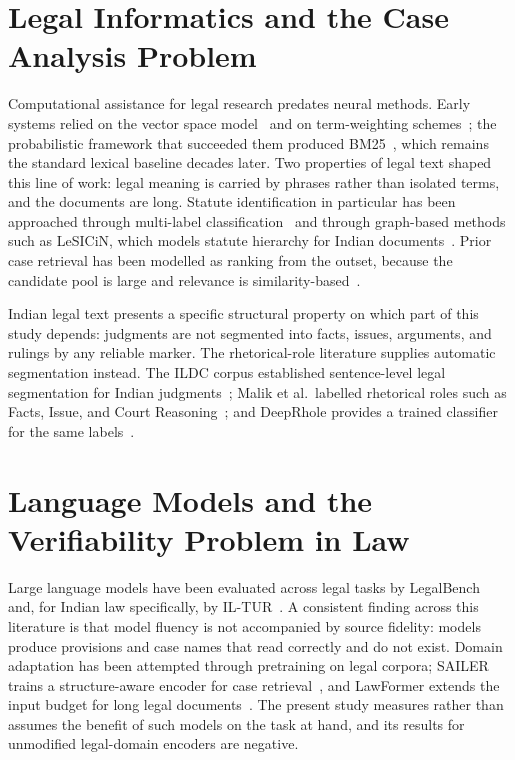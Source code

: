\documentclass{mnnit}
\begin{document}
\section{Legal Informatics and the Case Analysis Problem}
Computational assistance for legal research predates neural
methods. Early systems relied on the vector space
model~\cite{salton1975vector} and on term-weighting
schemes~\cite{salton1988termweight}; the probabilistic framework
that succeeded them produced BM25~\cite{bm25}, which remains the
standard lexical baseline decades later. Two properties of legal
text shaped this line of work: legal meaning is carried by
phrases rather than isolated terms, and the documents are long.
Statute identification in particular has been approached through
multi-label classification~\cite{luo2017fla,zhong2018topjudge}
and through graph-based methods such as LeSICiN, which models
statute hierarchy for Indian
documents~\cite{paul2022ilsi,paul2024legal}. Prior case retrieval
has been modelled as ranking from the outset, because the
candidate pool is large and relevance is
similarity-based~\cite{feng2024pcrsurvey}.

Indian legal text presents a specific structural property on
which part of this study depends: judgments are not segmented
into facts, issues, arguments, and rulings by any reliable
marker. The rhetorical-role literature supplies automatic
segmentation instead. The ILDC corpus established sentence-level
legal segmentation for Indian judgments~\cite{malik2021ildc};
Malik et al.\ labelled rhetorical roles such as Facts, Issue, and
Court Reasoning~\cite{malik2022rr}; and DeepRhole provides a
trained classifier for the same
labels~\cite{bhattacharya2023deeprhole}.

\section{Language Models and the Verifiability Problem in Law}
Large language models have been evaluated across legal tasks by
LegalBench~\cite{legalbench} and, for Indian law specifically, by
IL-TUR~\cite{iltur}. A consistent finding across this literature
is that model fluency is not accompanied by source fidelity:
models produce provisions and case names that read correctly and
do not exist. Domain adaptation has been attempted through
pretraining on legal corpora; SAILER trains a structure-aware
encoder for case retrieval~\cite{sailer}, and LawFormer extends
the input budget for long legal documents~\cite{lawformer}. The
present study measures rather than assumes the benefit of such
models on the task at hand, and its results for unmodified
legal-domain encoders are negative.
\end{document}
